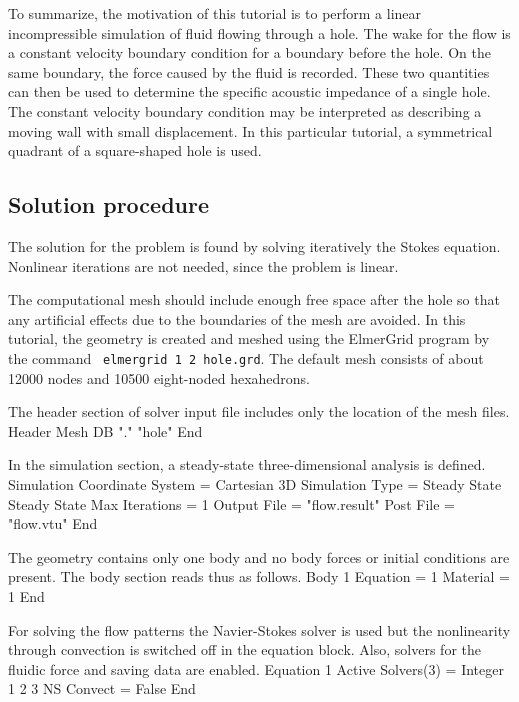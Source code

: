 To summarize, the motivation of this tutorial is to perform a linear
incompressible simulation of fluid flowing through a hole. The wake
for the flow is a constant velocity boundary condition for a boundary
before the hole. On the same boundary, the force caused by the fluid
is recorded. These two quantities can then be used to determine the
specific acoustic impedance of a single hole. The constant velocity
boundary condition may be interpreted as describing a moving wall with
small displacement. In this particular tutorial, a symmetrical
quadrant of a square-shaped hole is used.



\subsection*{Solution procedure}

The solution for the problem is found by solving iteratively the
Stokes equation. Nonlinear iterations are not needed, since the
problem is linear.

The computational mesh should include enough free space after the hole
so that any artificial effects due to the boundaries of the mesh are
avoided. In this tutorial, the geometry is created and meshed using
the ElmerGrid program by the command
{\tt
elmergrid 1 2 hole.grd}. 
The default mesh consists of about 12000 nodes and 10500 eight-noded
hexahedrons.

The header section of solver input file includes only the location of
the mesh files.
\ttbegin
Header
  Mesh DB "." "hole"
End
\ttend

In the simulation section, a steady-state three-dimensional analysis
is defined.
\ttbegin
Simulation
  Coordinate System = Cartesian 3D
  Simulation Type = Steady State
  Steady State Max Iterations = 1
  Output File = "flow.result"
  Post File = "flow.vtu"
End
\ttend

The geometry contains only one body and no body forces or initial
conditions are present. The body section reads thus as follows.
\ttbegin
Body 1
  Equation = 1
  Material = 1
End
\ttend

For solving the flow patterns the Navier-Stokes solver is used but the
nonlinearity through convection is switched off in the equation block.
Also, solvers for the fluidic force and saving data are enabled.
\ttbegin
Equation 1
  Active Solvers(3) = Integer 1 2 3
  NS Convect = False
End
\ttend

